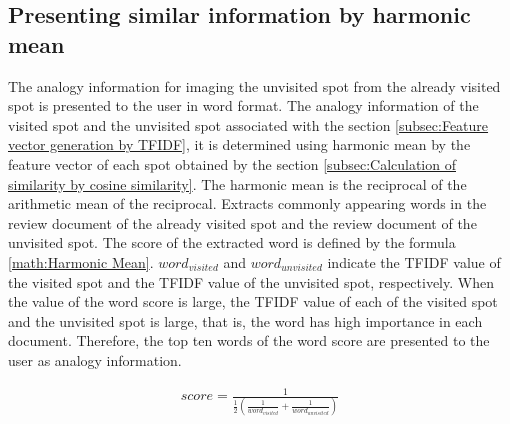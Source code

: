 \documentclass[journal]{IAENGtran}
\begin{document}
\subsection{Presenting similar information by harmonic mean}
\label{subsec:Presenting similar information by harmonic mean}
The analogy information for imaging the unvisited spot from the already visited spot is presented to the user in word format.
The analogy information of the visited spot and the unvisited spot associated with the section \ref{subsec:Feature vector generation by TFIDF}, it is determined using harmonic mean by the feature vector of each spot obtained by the section \ref{subsec:Calculation of similarity by cosine similarity}.
The harmonic mean is the reciprocal of the arithmetic mean of the reciprocal.
Extracts commonly appearing words in the review document of the already visited spot and the review document of the unvisited spot.
The score of the extracted word is defined by the formula \ref{math:Harmonic Mean}.
$word_{visited}$ and $word_{unvisited}$ indicate the TFIDF value of the visited spot and the TFIDF value of the unvisited spot, respectively.
When the value of the word score is large, the TFIDF value of each of the visited spot and the unvisited spot is large, that is, the word has high importance in each document.
Therefore, the top ten words of the word score are presented to the user as analogy information.

\begin{eqnarray}
  score=\frac{1}{\frac{1}{2}(\frac{1}{word_{visited}}+\frac{1}{word_{unvisited}})}
  \label{math:Harmonic Mean}
\end{eqnarray}
\end{document}
